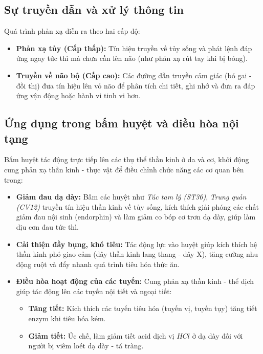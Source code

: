 \subsection{Sự truyền dẫn và xử lý thông tin}

Quá trình phản xạ diễn ra theo hai cấp độ:
\begin{itemize}
    \item \textbf{Phản xạ tủy (Cấp thấp):} Tín hiệu truyền về tủy sống và phát lệnh đáp ứng ngay tức thì mà chưa cần lên não (như phản xạ rút tay khi bị bỏng).
    \item \textbf{Truyền về não bộ (Cấp cao):} Các đường dẫn truyền cảm giác (bó gai - đồi thị) đưa tín hiệu lên vỏ não để phân tích chi tiết, ghi nhớ và đưa ra đáp ứng vận động hoặc hành vi tinh vi hơn.
\end{itemize}

\subsection{Ứng dụng trong bấm huyệt và điều hòa nội tạng}

Bấm huyệt tác động trực tiếp lên các thụ thể thần kinh ở da và cơ, khởi động cung phản xạ thần kinh - thực vật để điều chỉnh chức năng các cơ quan bên trong:

\begin{itemize}
    \item \textbf{Giảm đau dạ dày:} Bấm các huyệt như \textit{Túc tam lý (ST36)}, \textit{Trung quản (CV12)} truyền tín hiệu thần kinh về tủy sống, kích thích giải phóng các chất giảm đau nội sinh (endorphin) và làm giảm co bóp cơ trơn dạ dày, giúp làm dịu cơn đau tức thì.
    \item \textbf{Cải thiện đầy bụng, khó tiêu:} Tác động lực vào huyệt giúp kích thích hệ thần kinh phó giao cảm (dây thần kinh lang thang - dây X), tăng cường nhu động ruột và đẩy nhanh quá trình tiêu hóa thức ăn.
    \item \textbf{Điều hòa hoạt động của các tuyến:} Cung phản xạ thần kinh - thể dịch giúp tác động lên các tuyến nội tiết và ngoại tiết:
    \begin{itemize}
        \item \textbf{Tăng tiết:} Kích thích các tuyến tiêu hóa (tuyến vị, tuyến tụy) tăng tiết enzym khi tiêu hóa kém.
        \item \textbf{Giảm tiết:} Úc chế, làm giảm tiết acid dịch vị $HCl$ ở dạ dày đối với người bị viêm loét dạ dày - tá tràng.
    \end{itemize}
\end{itemize}

